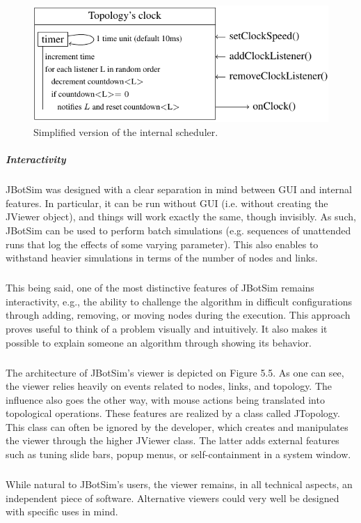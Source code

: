 \begin{figure}[h!]
	\centering
	\includegraphics[width=.7\linewidth]{fig_5}
	\caption[Simplified version of the internal scheduler.]{Simplified version of the internal scheduler.}
	\label{fig:fig5}
\end{figure}
\subparagraph{Interactivity}JBotSim was designed with a clear separation in mind between GUI and internal features. In particular, it can be run without GUI (i.e. without creating the JViewer object), and things will work exactly the same, though invisibly. As such, JBotSim can be used to perform batch simulations (e.g. sequences of unattended runs that log the effects of some varying parameter). This also enables to withstand heavier simulations in terms of the number of nodes and links.
\subparagraph{}This being said, one of the most distinctive features of JBotSim remains interactivity, e.g., the ability to challenge the algorithm in difficult configurations through adding, removing, or moving nodes during the execution. This approach proves useful to think of a problem visually and intuitively. It also makes it possible to explain someone an algorithm through showing its behavior.
\subparagraph{}The architecture of  JBotSim’s viewer is depicted on Figure 5.5. As one can see, the viewer relies heavily on events related to nodes, links, and topology. The influence also goes the other way, with mouse actions being translated into topological operations. These features are realized by a class called JTopology. This class can often be ignored by the developer, which creates and manipulates the viewer through the higher JViewer class. The latter adds external features such as tuning slide bars, popup menus, or self-containment in a system window. 
\subparagraph{}While natural to  JBotSim’s users, the viewer remains, in all technical aspects, an independent piece of software. Alternative viewers could very well be designed with specific uses in mind.

